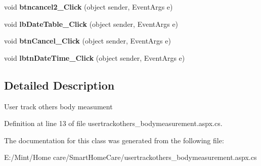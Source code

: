 \begin{DoxyCompactItemize}
\item 
\hypertarget{classusertrackothers__bodymeasurement_a8c828ef2d87ffa1f3fc9ad555937b8cb}{void {\bfseries btncancel2\-\_\-\-Click} (object sender, Event\-Args e)}\label{classusertrackothers__bodymeasurement_a8c828ef2d87ffa1f3fc9ad555937b8cb}

\item 
\hypertarget{classusertrackothers__bodymeasurement_ac8ae2ff0157232fe9df91d6dc7de35e9}{void {\bfseries lb\-Date\-Table\-\_\-\-Click} (object sender, Event\-Args e)}\label{classusertrackothers__bodymeasurement_ac8ae2ff0157232fe9df91d6dc7de35e9}

\item 
\hypertarget{classusertrackothers__bodymeasurement_ad7669be379cb2314939d5dc3b957a6d0}{void {\bfseries btn\-Cancel\-\_\-\-Click} (object sender, Event\-Args e)}\label{classusertrackothers__bodymeasurement_ad7669be379cb2314939d5dc3b957a6d0}

\item 
\hypertarget{classusertrackothers__bodymeasurement_a5f6f05d76aaa5927cd0f52b7c49cf575}{void {\bfseries lbtn\-Date\-Time\-\_\-\-Click} (object sender, Event\-Args e)}\label{classusertrackothers__bodymeasurement_a5f6f05d76aaa5927cd0f52b7c49cf575}

\end{DoxyCompactItemize}


\subsection{Detailed Description}
User track others body measument 

Definition at line 13 of file usertrackothers\-\_\-bodymeasurement.\-aspx.\-cs.



The documentation for this class was generated from the following file\-:\begin{DoxyCompactItemize}
\item 
E\-:/\-Mint/\-Home care/\-Smart\-Home\-Care/usertrackothers\-\_\-bodymeasurement.\-aspx.\-cs\end{DoxyCompactItemize}
